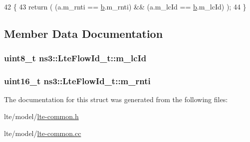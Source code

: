 \begin{DoxyCode}
42 \{
43   \textcolor{keywordflow}{return} ( (a.m\_rnti == \hyperlink{buildings__pathloss_8m_a21ad0bd836b90d08f4cf640b4c298e7c}{b}.m\_rnti) && (a.m\_lcId == \hyperlink{buildings__pathloss_8m_a21ad0bd836b90d08f4cf640b4c298e7c}{b}.m\_lcId) );
44 \}
\end{DoxyCode}


\subsection{Member Data Documentation}
\subsubsection[{\texorpdfstring{m\+\_\+lc\+Id}{m_lcId}}]{\setlength{\rightskip}{0pt plus 5cm}uint8\+\_\+t ns3\+::\+Lte\+Flow\+Id\+\_\+t\+::m\+\_\+lc\+Id}\hypertarget{structns3_1_1LteFlowId__t_a35feedba4d6f5a18fc68f2c9fad8432f}{}\label{structns3_1_1LteFlowId__t_a35feedba4d6f5a18fc68f2c9fad8432f}
\subsubsection[{\texorpdfstring{m\+\_\+rnti}{m_rnti}}]{\setlength{\rightskip}{0pt plus 5cm}uint16\+\_\+t ns3\+::\+Lte\+Flow\+Id\+\_\+t\+::m\+\_\+rnti}\hypertarget{structns3_1_1LteFlowId__t_a702ea933cb2ae3824ce6121f8d20983b}{}\label{structns3_1_1LteFlowId__t_a702ea933cb2ae3824ce6121f8d20983b}


The documentation for this struct was generated from the following files\+:\begin{DoxyCompactItemize}
\item 
lte/model/\hyperlink{lte-common_8h}{lte-\/common.\+h}\item 
lte/model/\hyperlink{lte-common_8cc}{lte-\/common.\+cc}\end{DoxyCompactItemize}
